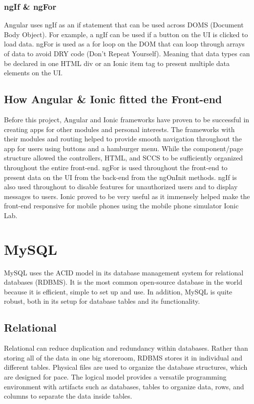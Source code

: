 \subsubsection{ngIf \& ngFor}
Angular uses ngIf as an if statement that can be used across DOMS (Document Body Object). For example, a ngIf can be used if a button on the UI is clicked to load data. ngFor is used as a for loop on the DOM that can loop through arrays of data to avoid DRY code (Don't Repeat Yourself). Meaning that data types can be declared in one HTML div or an Ionic item tag to present multiple data elements on the UI.

\subsection{How Angular \& Ionic fitted the Front-end}
Before this project, Angular and Ionic frameworks have proven to be successful in creating apps for other modules and personal interests. The frameworks with their modules and routing helped to provide smooth navigation throughout the app for users using buttons and a hamburger menu. While the component/page structure allowed the controllers, HTML, and SCCS to be sufficiently organized throughout the entire front-end. ngFor is used throughout the front-end to present data on the UI from the back-end from the ngOnInit methods. ngIf is also used throughout to disable features for unauthorized users and to display messages to users.
Ionic proved to be very useful as it immensely helped make the front-end responsive for mobile phones using the mobile phone simulator Ionic Lab.

\section{MySQL}
MySQL uses the ACID model in its database management system for relational databases (RDBMS). It is the most common open-source database in the world because it is efficient, simple to set up and use. \cite{ref17}  In addition, MySQL is quite robust, both in its setup for database tables and its functionality.
 
\subsection{Relational}
Relational can reduce duplication and redundancy within databases. Rather than storing all of the data in one big storeroom, RDBMS stores it in individual and different tables. Physical files are used to organize the database structures, which are designed for pace. The logical model provides a versatile programming environment with artifacts such as databases, tables to organize data, rows, and columns to separate the data inside tables. \cite{ref18}
 

